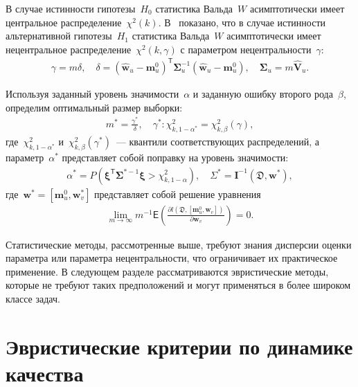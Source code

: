 В случае истинности гипотезы~$H_0$ статистика Вальда~$W$ асимптотически имеет центральное распределение~$\chi^2(k)$. В~\cite{shieh2005} показано, что в случае истинности альтернативной гипотезы~$H_1$ статистика Вальда~$W$ асимптотически имеет нецентральное распределение~$\chi^2(k,\gamma)$ с параметром нецентральности~$\gamma$:
\[
\label{eq:sb:17}
\begin{aligned}
	\gamma = m\delta, \quad \delta = \left(\hat{\textbf{w}}_{u} - \textbf{m}_{u}^{0}\right)^{\mathsf{T}}\bm{\Sigma}^{-1}_u\left(\hat{\textbf{w}}_{u} - \textbf{m}_{u}^{0}\right), \quad \bm{\Sigma}_u = m\hat{\textbf{V}}_u.
\end{aligned}
\]

Используя заданный уровень значимости~$\alpha$ и заданную ошибку второго рода~$\beta$, определим оптимальный размер выборки:
\[
\label{eq:sb:18}
\begin{aligned}
	m^* = \frac{\gamma^*}{\delta}, \quad \gamma^*:\chi^2_{k, 1-\alpha^{*}} = \chi^2_{k, \beta}\left(\gamma\right),
\end{aligned}
\]
где~$\chi^2_{k, 1-\alpha^*}$ и~$\chi^2_{k, \beta}\left(\gamma^*\right)$~--- квантили соответствующих распределений, а параметр~$\alpha^*$ представляет собой поправку на уровень значимости:
\[
\label{eq:sb:19}
\begin{aligned}
	\alpha^* = P\left(\bm{\xi}^{\mathsf{T}}\bm{\Sigma}^{*-1} \bm{\xi} > \chi^2_{k,1 - \alpha}\right), \quad \Sigma^* = \textbf{I}^{-1}\left(\mathfrak{D}, \textbf{w}^*\right),
\end{aligned}
\]
где~$\textbf{w}^{*} = \left[\textbf{m}_{u}^{0}, \textbf{w}^{*}_v\right]$ представляет собой решение уравнения
\[
\label{eq:sb:20}
\begin{aligned}
	\lim_{m\to\infty}m^{-1}\mathsf{E}\left(\frac{\partial l\left(\mathfrak{D}, \left[ \textbf{m}_{u}^{0}, \textbf{w}_{v}\right]\right)}{\partial \textbf{w}_{v}}\right) = 0.
\end{aligned}
\]

Статистические методы, рассмотренные выше, требуют знания дисперсии оценки параметра или параметра нецентральности, что ограничивает их практическое применение. В следующем разделе рассматриваются эвристические методы, которые не требуют таких предположений и могут применяться в более широком классе задач.

\section{Эвристические критерии по динамике качества}

